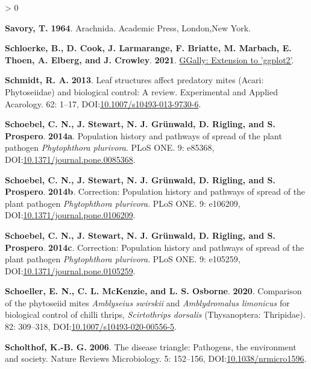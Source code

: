 \documentclass{ufdissertation}[overrideChapters] %
\newlength{\cslhangindent}
\newenvironment{CSLReferences}[2] %
 {%
  \setlength{\parindent}{0pt}
  \ifodd #1 \everypar{\setlength{\hangindent}{\cslhangindent}}\ignorespaces\fi
  \ifnum #2 > 0
  \setlength{\parskip}{#2\baselineskip}
  \fi
 }%
 {}
\begin{document}
{\begin{CSLReferences}{1}{1}
\leavevmode{}%
\textbf{Savory, T.} \textbf{1964}. Arachnida. Academic Press, London,New York.

\leavevmode{}%
\textbf{Schloerke, B., D. Cook, J. Larmarange, F. Briatte, M. Marbach, E. Thoen, A. Elberg, and J. Crowley}. \textbf{2021}. \href{https://CRAN.R-project.org/package=GGally}{{GGally}: Extension to 'ggplot2'}.

\leavevmode{}%
\textbf{Schmidt, R. A.} \textbf{2013}. Leaf structures affect predatory mites ({Acari}: {Phytoseiidae}) and biological control: A review. Experimental and Applied Acarology. 62: 1--17, DOI:\href{https://doi.org/10.1007/s10493-013-9730-6}{10.1007/s10493-013-9730-6}.

\leavevmode{}%
\textbf{Schoebel, C. N., J. Stewart, N. J. Grünwald, D. Rigling, and S. Prospero}. \textbf{2014a}. Population history and pathways of spread of the plant pathogen {\emph{Phytophthora plurivora}}. {PLoS} {ONE}. 9: e85368, DOI:\href{https://doi.org/10.1371/journal.pone.0085368}{10.1371/journal.pone.0085368}.

\leavevmode{}%
\textbf{Schoebel, C. N., J. Stewart, N. J. Grünwald, D. Rigling, and S. Prospero}. \textbf{2014b}. Correction: Population history and pathways of spread of the plant pathogen {\emph{Phytophthora plurivora}}. {PLoS} {ONE}. 9: e106209, DOI:\href{https://doi.org/10.1371/journal.pone.0106209}{10.1371/journal.pone.0106209}.

\leavevmode{}%
\textbf{Schoebel, C. N., J. Stewart, N. J. Grünwald, D. Rigling, and S. Prospero}. \textbf{2014c}. Correction: Population history and pathways of spread of the plant pathogen {\emph{Phytophthora plurivora}}. {PLoS} {ONE}. 9: e105259, DOI:\href{https://doi.org/10.1371/journal.pone.0105259}{10.1371/journal.pone.0105259}.

\leavevmode{}%
\textbf{Schoeller, E. N., C. L. McKenzie, and L. S. Osborne}. \textbf{2020}. Comparison of the phytoseiid mites {\emph{Amblyseius swirskii}} and {\emph{Amblydromalus limonicus}} for biological control of chilli thrips, {\emph{Scirtothrips dorsalis}} ({Thysanoptera}: {Thripidae}). 82: 309--318, DOI:\href{https://doi.org/10.1007/s10493-020-00556-5}{10.1007/s10493-020-00556-5}.

\leavevmode{}%
\textbf{Scholthof, K.-B. G.} \textbf{2006}. The disease triangle: Pathogens, the environment and society. Nature Reviews Microbiology. 5: 152--156, DOI:\href{https://doi.org/10.1038/nrmicro1596}{10.1038/nrmicro1596}.


\end{CSLReferences}}
\end{document}
